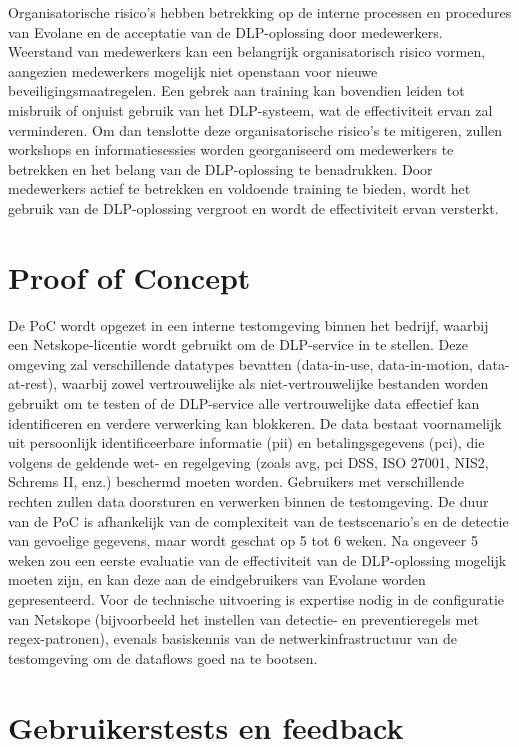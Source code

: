 Organisatorische risico's hebben betrekking op de interne processen en procedures van Evolane en de acceptatie van de DLP-oplossing door medewerkers. 
Weerstand van medewerkers kan een belangrijk organisatorisch risico vormen, aangezien medewerkers mogelijk niet openstaan voor nieuwe beveiligingsmaatregelen. 
Een gebrek aan training kan bovendien leiden tot misbruik of onjuist gebruik van het DLP-systeem, wat de effectiviteit ervan zal verminderen. 
Om dan tenslotte deze organisatorische risico's te mitigeren, zullen workshops en informatiesessies worden georganiseerd om medewerkers te betrekken en het belang van de DLP-oplossing te benadrukken. 
Door medewerkers actief te betrekken en voldoende training te bieden, wordt het gebruik van de DLP-oplossing vergroot en wordt de effectiviteit ervan versterkt.

\section{Proof of Concept}%

De PoC wordt opgezet in een interne testomgeving binnen het bedrijf, waarbij een Netskope-licentie wordt gebruikt om de DLP-service in te stellen. 
Deze omgeving zal verschillende datatypes bevatten (data-in-use, data-in-motion, data-at-rest), 
waarbij zowel vertrouwelijke als niet\--vertr\-ouwelijke bestanden worden gebruikt om te testen of de DLP-service alle vertrouwelijke data effectief kan identificeren en verdere verwerking kan blokkeren. 
De data bestaat voornamelijk uit persoonlijk identificeerbare informatie (\gls{pii}) en betalingsgegevens (\gls{pci}), die volgens de geldende wet- en regelgeving (zoals \gls{avg}, \gls{pci} DSS, ISO 27001, NIS2, Schrems II, enz.) beschermd moeten worden. 
Gebruikers met verschillende rechten zullen data doorsturen en verwerken binnen de testomgeving. 
De duur van de PoC is afhankelijk van de complexiteit van de testscenario's en de detectie van gevoelige gegevens, 
maar wordt geschat op 5 tot 6 weken. 
Na ongeveer 5 weken zou een eerste evaluatie van de effectiviteit van de DLP-oplossing mogelijk moeten zijn, 
en kan deze aan de eindgebruikers van Evolane worden gepresenteerd. 
Voor de technische uitvoering is expertise nodig in de configuratie van Netskope (bijvoorbeeld het instellen van detectie- en preventieregels met regex-patronen), 
evenals basiskennis van de netwerkinfrastructuur van de testomgeving om de dataflows goed na te bootsen.

\section{Gebruikerstests en feedback}%

